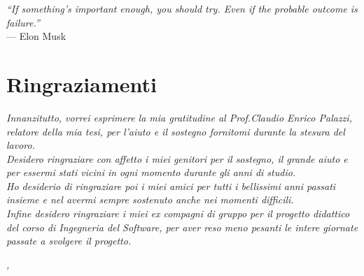 
\cleardoublepage
{}
{}

\begin{flushright}{
	\slshape    
	``If something's important enough, you should try. Even if the probable outcome is failure.''} \\ 
	\medskip
   	--- Elon Musk 
\end{flushright}


\bigskip

\begingroup
\let\clearpage\relax
\let\cleardoublepage\relax
\let\cleardoublepage\relax

\chapter*{Ringraziamenti}

\noindent \textit{Innanzitutto, vorrei esprimere la mia gratitudine al Prof.Claudio Enrico Palazzi, relatore della mia tesi, per l'aiuto e il sostegno fornitomi durante la stesura del lavoro.}\\

\noindent \textit{Desidero ringraziare con affetto i miei genitori per il sostegno, il grande aiuto e per essermi stati vicini in ogni momento durante gli anni di studio.}\\

\noindent \textit{Ho desiderio di ringraziare poi i miei amici per tutti i bellissimi anni passati insieme e nel avermi sempre sostenuto anche nei momenti difficili.}\\

\noindent \textit{Infine desidero ringraziare i miei ex compagni di gruppo per il progetto didattico del corso di Ingegneria del Software, per aver reso meno pesanti le intere giornate passate a svolgere il progetto.}
\bigskip

\noindent\textit{\myLocation, \myTime}
\hfill \myName

\endgroup

